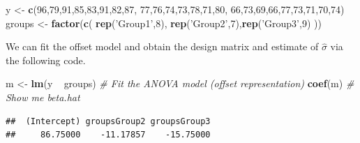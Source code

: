 \documentclass[]{book}
\newenvironment{Shaded}{\begin{snugshade}}{\end{snugshade}}
\newcommand{\KeywordTok}[1]{\textcolor[rgb]{0.13,0.29,0.53}{\textbf{{#1}}}}
\newcommand{\DecValTok}[1]{\textcolor[rgb]{0.00,0.00,0.81}{{#1}}}
\newcommand{\StringTok}[1]{\textcolor[rgb]{0.31,0.60,0.02}{{#1}}}
\newcommand{\CommentTok}[1]{\textcolor[rgb]{0.56,0.35,0.01}{\textit{{#1}}}}
\newcommand{\NormalTok}[1]{{#1}}
\theoremstyle{definition}
\theoremstyle{definition}
\theoremstyle{remark}
\begin{document}
\begin{Shaded}
\begin{Highlighting}[]
\NormalTok{y <-}\StringTok{ }\KeywordTok{c}\NormalTok{(}\DecValTok{96}\NormalTok{,}\DecValTok{79}\NormalTok{,}\DecValTok{91}\NormalTok{,}\DecValTok{85}\NormalTok{,}\DecValTok{83}\NormalTok{,}\DecValTok{91}\NormalTok{,}\DecValTok{82}\NormalTok{,}\DecValTok{87}\NormalTok{,}
       \DecValTok{77}\NormalTok{,}\DecValTok{76}\NormalTok{,}\DecValTok{74}\NormalTok{,}\DecValTok{73}\NormalTok{,}\DecValTok{78}\NormalTok{,}\DecValTok{71}\NormalTok{,}\DecValTok{80}\NormalTok{,}
       \DecValTok{66}\NormalTok{,}\DecValTok{73}\NormalTok{,}\DecValTok{69}\NormalTok{,}\DecValTok{66}\NormalTok{,}\DecValTok{77}\NormalTok{,}\DecValTok{73}\NormalTok{,}\DecValTok{71}\NormalTok{,}\DecValTok{70}\NormalTok{,}\DecValTok{74}\NormalTok{)}
\NormalTok{groups <-}\StringTok{ }\KeywordTok{factor}\NormalTok{(}\KeywordTok{c}\NormalTok{( }\KeywordTok{rep}\NormalTok{(}\StringTok{'Group1'}\NormalTok{,}\DecValTok{8}\NormalTok{), }\KeywordTok{rep}\NormalTok{(}\StringTok{'Group2'}\NormalTok{,}\DecValTok{7}\NormalTok{),}\KeywordTok{rep}\NormalTok{(}\StringTok{'Group3'}\NormalTok{,}\DecValTok{9}\NormalTok{) ))}
\end{Highlighting}
\end{Shaded}

We can fit the offset model and obtain the design matrix and estimate of
\(\hat{\sigma}\) via the following code.

\begin{Shaded}
\begin{Highlighting}[]
\NormalTok{m <-}\StringTok{ }\KeywordTok{lm}\NormalTok{(y ~}\StringTok{ }\NormalTok{groups)            }\CommentTok{# Fit the ANOVA model (offset representation)}
\KeywordTok{coef}\NormalTok{(m)                        }\CommentTok{# Show me beta.hat}
\end{Highlighting}
\end{Shaded}

\begin{verbatim}
##  (Intercept) groupsGroup2 groupsGroup3 
##     86.75000    -11.17857    -15.75000
\end{verbatim}

\begin{Shaded}
\end{Shaded}
\end{document}
